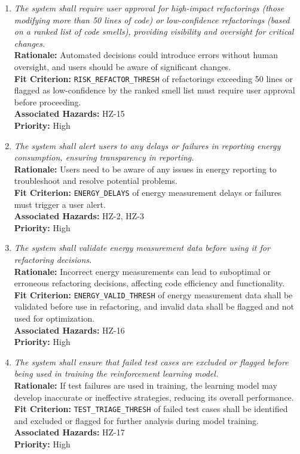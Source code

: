 \documentclass{article}
\begin{document}
\begin{enumerate}[label=SCR \arabic*., wide=0pt, leftmargin=*]
    \item \emph{The system shall require user approval for high-impact refactorings (those modifying more than 50 lines of code) or low-confidence refactorings (based on a ranked list of code smells), providing visibility and oversight for critical changes.}\\
    {\bf Rationale:} Automated decisions could introduce errors without human oversight, and users should be aware of significant changes.\\
    {\bf Fit Criterion:} \texttt{RISK\_REFACTOR\_THRESH} of refactorings exceeding 50 lines or flagged as low-confidence by the ranked smell list must require user approval before proceeding.\\
    {\bf Associated Hazards:} HZ-15\\
    {\bf Priority:} High

    \item \emph{The system shall alert users to any delays or failures in reporting energy consumption, ensuring transparency in reporting.}\\
    {\bf Rationale:} Users need to be aware of any issues in energy reporting to troubleshoot and resolve potential problems.\\
    {\bf Fit Criterion:} \texttt{ENERGY\_DELAYS} of energy measurement delays or failures must trigger a user alert.\\
    {\bf Associated Hazards:} HZ-2, HZ-3\\
    {\bf Priority:} High

    \item \emph{The system shall validate energy measurement data before using it for refactoring decisions.}\\
    {\bf Rationale:} Incorrect energy measurements can lead to suboptimal or erroneous refactoring decisions, affecting code efficiency and functionality.\\
    {\bf Fit Criterion:} \texttt{ENERGY\_VALID\_THRESH} of energy measurement data shall be validated before use in refactoring, and invalid data shall be flagged and not used for optimization.\\
    {\bf Associated Hazards:} HZ-16\\
    {\bf Priority:} High

    \item \emph{The system shall ensure that failed test cases are excluded or flagged before being used in training the reinforcement learning model.}\\
    {\bf Rationale:} If test failures are used in training, the learning model may develop inaccurate or ineffective strategies, reducing its overall performance.\\
    {\bf Fit Criterion:} \texttt{TEST\_TRIAGE\_THRESH} of failed test cases shall be identified and excluded or flagged for further analysis during model training.\\
    {\bf Associated Hazards:} HZ-17\\
    {\bf Priority:} High


\end{enumerate}
\end{document}
